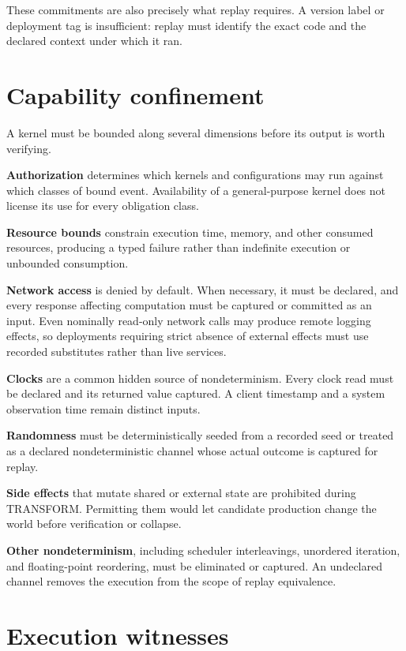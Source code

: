 \documentclass[11pt,openany]{book}
\begin{document}
These commitments are also precisely what replay requires. A version label or
deployment tag is insufficient: replay must identify the exact code and the
declared context under which it ran.

\section{Capability confinement}

A kernel must be bounded along several dimensions before its output is worth
verifying.

\textbf{Authorization} determines which kernels and configurations may run
against which classes of bound event. Availability of a general-purpose kernel
does not license its use for every obligation class.

\textbf{Resource bounds} constrain execution time, memory, and other consumed
resources, producing a typed failure rather than indefinite execution or
unbounded consumption.

\textbf{Network access} is denied by default. When necessary, it must be
declared, and every response affecting computation must be captured or
committed as an input. Even nominally read-only network calls may produce
remote logging effects, so deployments requiring strict absence of external
effects must use recorded substitutes rather than live services.

\textbf{Clocks} are a common hidden source of nondeterminism. Every clock read
must be declared and its returned value captured. A client timestamp and a
system observation time remain distinct inputs.

\textbf{Randomness} must be deterministically seeded from a recorded seed or
treated as a declared nondeterministic channel whose actual outcome is
captured for replay.

\textbf{Side effects} that mutate shared or external state are prohibited
during TRANSFORM. Permitting them would let candidate production change the
world before verification or collapse.

\textbf{Other nondeterminism}, including scheduler interleavings, unordered
iteration, and floating-point reordering, must be eliminated or captured. An
undeclared channel removes the execution from the scope of replay equivalence.

\section{Execution witnesses}
\end{document}
